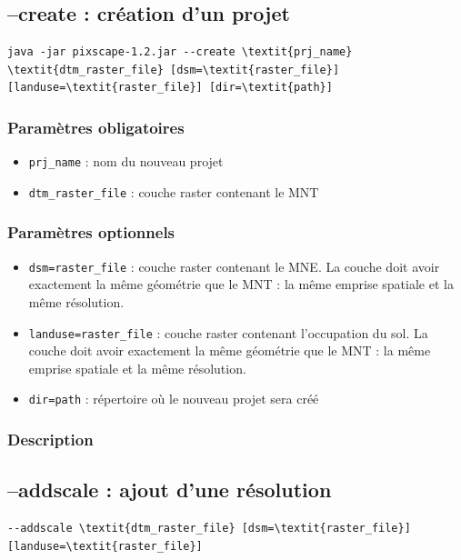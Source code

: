 \documentclass{report}
\begin{document}
\subsection{--create : création d'un projet}
\begin{Verbatim}[commandchars=\\\{\}]
java -jar pixscape-1.2.jar --create \textit{prj_name} \textit{dtm_raster_file} [dsm=\textit{raster_file}] [landuse=\textit{raster_file}] [dir=\textit{path}]
\end{Verbatim}

\subsubsection{Paramètres obligatoires}
\begin{itemize}
	\item \verb|prj_name| : nom du nouveau projet
	\item \verb|dtm_raster_file| : couche raster contenant le MNT
\end{itemize}

\subsubsection{Paramètres optionnels}
\begin{itemize}
	\item \verb|dsm=raster_file| : couche raster contenant le MNE. La couche doit avoir exactement la même géométrie que le MNT : la même emprise spatiale et la même résolution.
	\item \verb|landuse=raster_file| : couche raster contenant l'occupation du sol. La couche doit avoir exactement la même géométrie que le MNT : la même emprise spatiale et la même résolution.
	\item \verb|dir=path| : répertoire où le nouveau projet sera créé
\end{itemize}

\subsubsection{Description}


\subsection{--addscale : ajout d'une résolution}
\begin{Verbatim}[commandchars=\\\{\}]
--addscale \textit{dtm_raster_file} [dsm=\textit{raster_file}] [landuse=\textit{raster_file}]
\end{Verbatim}
\end{document}
